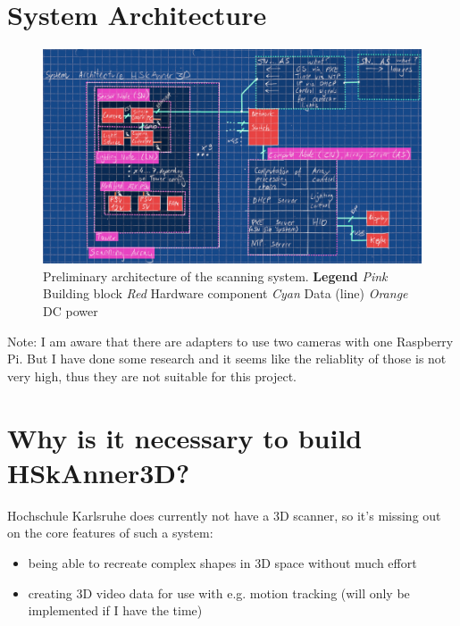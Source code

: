 \section{System Architecture}
    \begin{figure}[H]
        \centerline{\includegraphics[width=\linewidth]{what/sysarch-system.png}}
        \caption{Preliminary architecture of the scanning system. \newline
	        \textbf{Legend}\newline
	        \textit{Pink} Building block \newline
	        \textit{Red} Hardware component \newline
	        \textit{Cyan} Data (line) \newline
        		\textit{Orange} DC power
        }
    \label{sysarch-system}
    \end{figure}
    
    Note: I am aware that there are adapters to use two cameras with one Raspberry Pi. But I have done some research and it seems like the reliablity of those is not very high, thus they are not suitable for this project.
    
\section{Why is it necessary to build HSkAnner3D?}
	Hochschule Karlsruhe does currently not have a 3D scanner, so it's missing out on the core features of such a system:
	\begin{itemize}
		\item being able to recreate complex shapes in 3D space without much effort
		\item creating 3D video data for use with e.g. motion tracking (will only be implemented if I have the time)
	\end{itemize}

